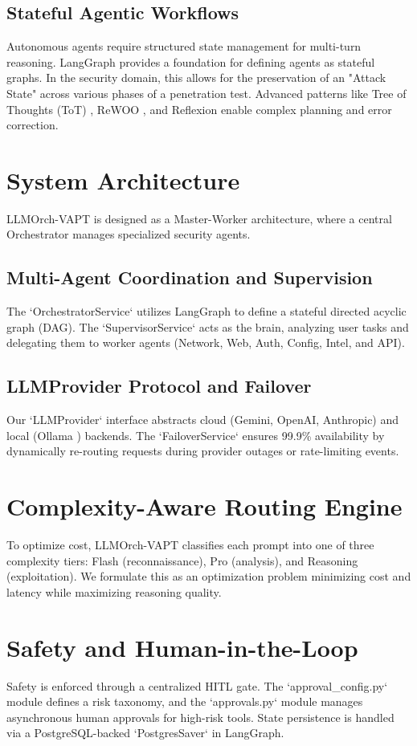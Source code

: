 \documentclass[conference,compsoc]{IEEEtran}
\begin{document}
\subsection{Stateful Agentic Workflows}
Autonomous agents require structured state management for multi-turn reasoning. LangGraph \cite{langgraph} provides a foundation for defining agents as stateful graphs. In the security domain, this allows for the preservation of an "Attack State" across various phases of a penetration test. Advanced patterns like Tree of Thoughts (ToT) \cite{tot}, ReWOO \cite{rewoo}, and Reflexion \cite{reflexion} enable complex planning and error correction.

\section{System Architecture}
LLMOrch-VAPT is designed as a Master-Worker architecture, where a central Orchestrator manages specialized security agents.

\subsection{Multi-Agent Coordination and Supervision}
The `OrchestratorService` utilizes LangGraph to define a stateful directed acyclic graph (DAG). The `SupervisorService` acts as the brain, analyzing user tasks and delegating them to worker agents (Network, Web, Auth, Config, Intel, and API).

\subsection{LLMProvider Protocol and Failover}
Our `LLMProvider` interface abstracts cloud (Gemini, OpenAI, Anthropic) and local (Ollama \cite{ollama}) backends. The `FailoverService` ensures 99.9\% availability by dynamically re-routing requests during provider outages or rate-limiting events.

\section{Complexity-Aware Routing Engine}
To optimize cost, LLMOrch-VAPT classifies each prompt into one of three complexity tiers: Flash (reconnaissance), Pro (analysis), and Reasoning (exploitation). We formulate this as an optimization problem minimizing cost and latency while maximizing reasoning quality.

\section{Safety and Human-in-the-Loop}
Safety is enforced through a centralized HITL gate. The `approval\_config.py` module defines a risk taxonomy, and the `approvals.py` module manages asynchronous human approvals for high-risk tools. State persistence is handled via a PostgreSQL-backed `PostgresSaver` in LangGraph.
\end{document}
